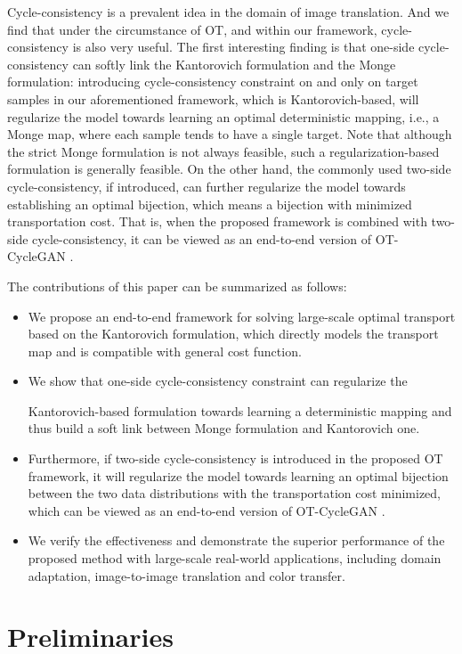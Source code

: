 \documentclass[runningheads]{llncs}
\begin{document}
Cycle-consistency is a prevalent idea in the domain of image translation. And we find that under the circumstance of OT, and within our framework, cycle-consistency is also very useful. The first interesting finding is that one-side cycle-consistency can softly link the Kantorovich formulation and the Monge formulation: introducing cycle-consistency constraint on and only on target samples in our aforementioned framework, which is Kantorovich-based, will regularize the model towards learning an optimal deterministic mapping, i.e., a Monge map, where each sample tends to have a single target. Note that although the strict Monge formulation is not always feasible, such a regularization-based formulation is generally feasible. On the other hand, the commonly used two-side cycle-consistency, if introduced, can further regularize the model towards establishing an optimal bijection, which means a bijection with minimized transportation cost. That is, when the proposed framework is combined with two-side cycle-consistency, it can be viewed as an end-to-end version of OT-CycleGAN \cite{ot-cyclegan}. 

The contributions of this paper can be summarized as follows:
\begin{itemize}
	\item We propose an end-to-end framework for solving large-scale optimal transport based on the Kantorovich formulation, which directly models the transport map and is compatible with general cost function. 
	\item We show that one-side cycle-consistency constraint can regularize the 
	
	Kantorovich-based formulation towards learning a deterministic mapping and thus build a soft link between Monge formulation and Kantorovich one. 
	\item Furthermore, if two-side cycle-consistency is introduced in the proposed OT framework, it will regularize the model towards learning an optimal bijection between the two data distributions with the transportation cost minimized, which can be viewed as an end-to-end version of OT-CycleGAN \cite{ot-cyclegan}. 
	\item We verify the effectiveness and demonstrate the superior performance of the proposed method with large-scale real-world applications, including domain adaptation, image-to-image translation and color transfer. 
\end{itemize}

\section{Preliminaries}
\end{document}
